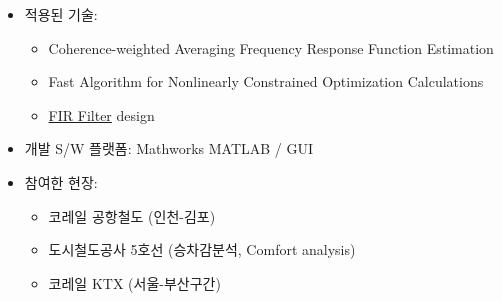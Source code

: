 \documentclass[10pt,a4paper,ragged2e]{altacv}
\begin{document}
\begin{fullwidth}
\begin{itemize}
\item 적용된 기술:
\begin{itemize}
  \item Coherence-weighted Averaging Frequency Response Function Estimation
  \item Fast Algorithm for Nonlinearly Constrained Optimization Calculations
  \item \href{https://en.wikipedia.org/wiki/Finite_impulse_response}{FIR Filter} design
\end{itemize}
\item 개발 S/W 플랫폼: Mathworks MATLAB / GUI
\item 참여한 현장:
\begin{itemize} 
  \item 코레일 공항철도 (인천-김포)
  \item 도시철도공사 5호선 (승차감분석, Comfort analysis)
  \item 코레일 KTX (서울-부산구간)
\end{itemize}
\end{itemize}

\divider



\end{fullwidth}
\end{document}
